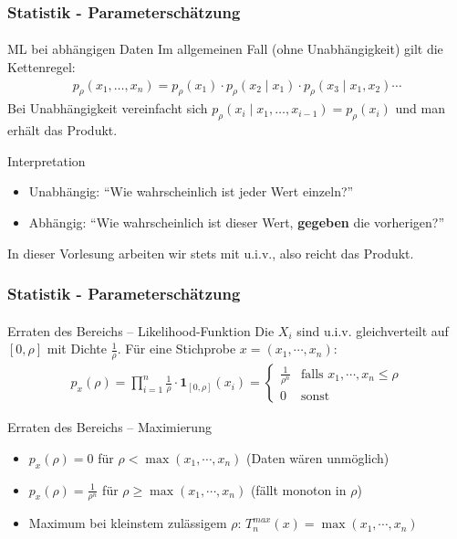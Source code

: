 \documentclass{beamer}
\begin{document}
\begin{frame}
    \frametitle{Statistik - Parameterschätzung}
\framesubtitle{}
\begin{block}{ML bei abhängigen Daten}
Im allgemeinen Fall (ohne Unabhängigkeit) gilt die Kettenregel:
\begin{align*}
p_\rho(x_1, \ldots, x_n) = p_\rho(x_1) \cdot p_\rho(x_2 \mid x_1) \cdot p_\rho(x_3 \mid x_1, x_2) \cdots
\end{align*}
Bei Unabhängigkeit vereinfacht sich $p_\rho(x_i \mid x_1, \ldots, x_{i-1}) = p_\rho(x_i)$ und man erhält das Produkt.
\end{block}

\begin{block}{Interpretation}
\begin{itemize}
\item Unabhängig: ``Wie wahrscheinlich ist jeder Wert einzeln?''
\item Abhängig: ``Wie wahrscheinlich ist dieser Wert, \textbf{gegeben} die vorherigen?''
\end{itemize}
In dieser Vorlesung arbeiten wir stets mit u.i.v., also reicht das Produkt.
\end{block}

 \end{frame}



\begin{frame}
    \frametitle{Statistik - Parameterschätzung}
\framesubtitle{}
\begin{block}{Erraten des Bereichs -- Likelihood-Funktion}
Die $X_i$ sind u.i.v. gleichverteilt auf $[0, \rho]$ mit Dichte $\frac{1}{\rho}$. Für eine Stichprobe $x = (x_1, \cdots, x_n)$:
\begin{align*}
p_x (\rho) = \prod_{i=1}^n \frac{1}{\rho} \cdot \mathbf{1}_{[0,\rho]}(x_i) =  \begin{cases}  \frac{1}{\rho^n}  & \text{falls }  x_1, \cdots , x_n \leq \rho  \\  0  & \text{sonst}\end {cases}
\end{align*}
\end{block}

\begin{block}{Erraten des Bereichs -- Maximierung}
\begin{itemize}
\item $p_x(\rho) = 0$ für $\rho < \max(x_1, \cdots, x_n)$ (Daten wären unmöglich)
\item $p_x(\rho) = \frac{1}{\rho^n}$ für $\rho \geq \max(x_1, \cdots, x_n)$ (fällt monoton in $\rho$)
\item Maximum bei kleinstem zulässigem $\rho$: $T_n^{max}(x) = \max(x_1, \cdots, x_n)$
\end{itemize}
\end{block}

 \end{frame}
\end{document}
